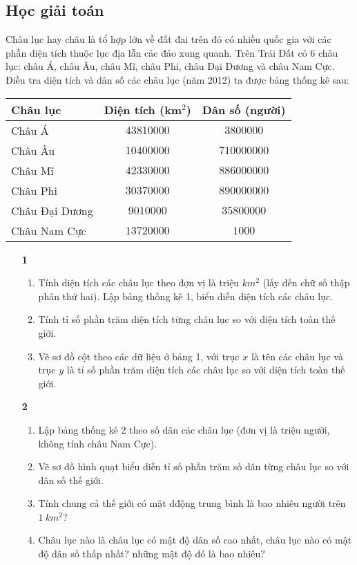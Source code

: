 \subsection{Học giải toán}

\begin{vd}%
	Châu lục hay châu là tổ hợp lớn về đất đai trên đó có nhiều quốc gia với các phần diện tích thuộc lục địa lẫn các đảo xung quanh. Trên Trái Đất có 6 châu lục: châu Á, châu Âu, châu Mĩ, châu Phi, châu Đại Dương và châu Nam Cực. Điều tra diện tích và dân số các châu lục (năm 2012) ta được bảng thống kê sau:
	\begin{center}
		\begin{tabular}{|l|c|c|}
			\hline Châu lục & Diện tích (km$ ^2 $) & Dân số (người)\\
			\hline Châu Á & $43810000$  & $3800000$\\ 
			\hline Châu Âu & $10400000$  & $710000000$ \\ 
			\hline Châu Mĩ &  $42330000$  & $886000000$ \\ 
			\hline Châu Phi & $30370000$  & $890000000$ \\
			\hline Châu Đại Dương &  $9010000$  & $35800000$ \\ 
			\hline Châu Nam Cực & $13720000$  & $1000$ \\
			\hline
		\end{tabular}
	\end{center}
	\begin{itemize}
		\item[\textbf{1}] 
		
		\begin{enumerate}
			\item Tính diện tích các châu lục theo đợn vị là triệu $ km^2 $ (lấy đến chữ số thập phân thứ hai).  Lập bảng thống kê 1, biểu diễn diện tích các châu lục.
			\item Tính tỉ số phần trăm diện tích từng châu lục so với diện tích toàn thế giới.
			\item Vẽ sơ đồ cột theo các dữ liệu ở bảng 1, với trục $ x $ là tên các châu lục và trục $ y $ là tỉ số phần trăm diện tích các châu lục so với diện tích toàn thế giới.
		\end{enumerate}
		\item[\textbf{2}]
		\begin{enumerate}
			\item Lập bảng thống kê 2 theo số dân các châu lục (đơn vị là triệu người, không tính châu Nam Cực).
			\item Vẽ sơ đồ hình quạt biểu diễn tỉ số phần trăm số dân từng châu lục so với dân số thế giới.
			\item Tính chung cả thế giới có mật dđộng trung bình là bao nhiêu người trên $ 1 \: km^2 $?
			\item Châu lục nào là châu lục có mật độ dân số cao nhất, châu lục nào có mật độ dân số thấp nhất? những mật độ đó là bao nhiêu?
		\end{enumerate}
	\end{itemize}
	

\end{vd}
